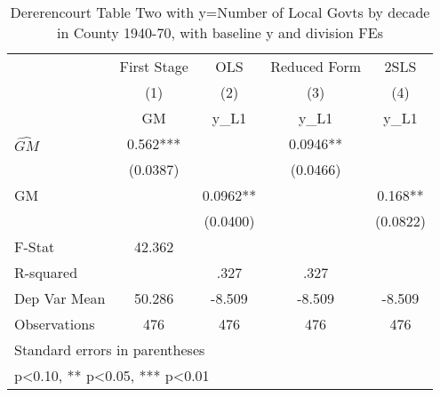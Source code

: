 \begin{table}[htbp]\centering
\def\sym#1{\ifmmode^{#1}\else\(^{#1}\)\fi}
\caption{Dererencourt Table Two with y=Number of Local Govts by decade in County 1940-70, with baseline y and division FEs}
\begin{tabular}{l*{4}{c}}
\toprule
                    & First Stage   &         OLS   &Reduced Form   &        2SLS   \\
                    &\multicolumn{1}{c}{(1)}&\multicolumn{1}{c}{(2)}&\multicolumn{1}{c}{(3)}&\multicolumn{1}{c}{(4)}\\
                    &\multicolumn{1}{c}{GM}&\multicolumn{1}{c}{y\_L1}&\multicolumn{1}{c}{y\_L1}&\multicolumn{1}{c}{y\_L1}\\
\midrule
$\hat{GM}$          &       0.562***&               &      0.0946** &               \\
                    &    (0.0387)   &               &    (0.0466)   &               \\
\addlinespace
GM                  &               &      0.0962** &               &       0.168** \\
                    &               &    (0.0400)   &               &    (0.0822)   \\
\midrule
F-Stat              &      42.362   &               &               &               \\
R-squared           &               &        .327   &        .327   &               \\
Dep Var Mean        &      50.286   &      -8.509   &      -8.509   &      -8.509   \\
Observations        &         476   &         476   &         476   &         476   \\
\bottomrule
\multicolumn{5}{l}{\footnotesize Standard errors in parentheses}\\
\multicolumn{5}{l}{\footnotesize * p<0.10, ** p<0.05, *** p<0.01}\\
\end{tabular}
\end{table}
